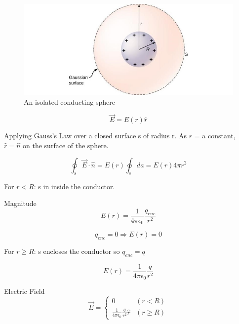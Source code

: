 \documentclass[14pt]{memoir}
\begin{document}
\begin{figure}[H]
\begin{center}
\includegraphics[scale=0.50]{fig/fig_07_38.jpg}
\caption{An isolated conducting sphere}
\label{fig:07_38}
\end{center}
\end{figure}

\begin{equation}
\vec{E} = E(r) \hat{r} 
\end{equation}

Applying Gauss's Law over a closed surface s of radius r. As $r$ = a constant, $\hat{r} = \hat{n}$ on the surface of the sphere. 

\begin{equation}
\oint_s \vec{E} \cdot \hat{n} = E(r) \oint_s da = E(r) 4 \pi r^2
\end{equation} 

For $r < R$: s in inside the conductor.

Magnitude
\begin{equation}
E(r) = \frac{1}{4 \pi \epsilon_0} \frac{q_{enc}}{r^2}
\end{equation}

\begin{equation}
q_{enc} = 0 \Rightarrow E(r) = 0
\end{equation}

For $r \geq R$: s encloses the conductor so $q_{enc} = q$

\begin{equation}
E(r) = \frac{1}{4 \pi \epsilon_0} \frac{q}{r^2}
\end{equation}

Electric Field
\begin{equation}
  \vec{E} =\begin{cases}
    0 & (r < R)\\
    \frac{1}{4 \pi \epsilon_0} \frac{q}{r^2} \hat{r} & (r \geq R)
  \end{cases}
\end{equation}
\end{document}
